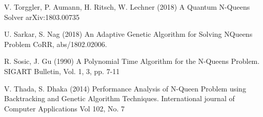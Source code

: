\documentclass[a4paper,onecolumn,11pt]{article}
\begin{document}
\begin{thebibliography}{99.}
 V. Torggler, P. Aumann, H. Ritsch, W. Lechner (2018) A Quantum N-Queens Solver arXiv:1803.00735 

 U. Sarkar, S. Nag (2018) An Adaptive Genetic Algorithm for Solving NQueens Problem CoRR, abs/1802.02006.

 R. Sosic, J. Gu (1990) A Polynomial Time Algorithm for the N-Queens Problem. SIGART Bulletin, Vol. 1, 3, pp. 7-11

 V. Thada, S. Dhaka (2014) Performance Analysis of N-Queen Problem using Backtracking and Genetic Algorithm Techniques. International journal of Computer Applications Vol 102, No. 7


\end{thebibliography}
\end{document}
